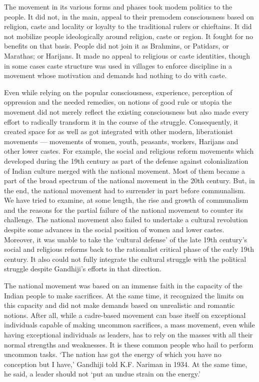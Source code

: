 The movement in its various forms and phases took modem politics to the people. It did not, in the main, appeal to their pre­modem consciousness based on religion, caste and locality or loyalty to the traditional rulers or chieftains. It did not mobilize people ideologically around religion, caste or region. It fought for no benefits on that basis. People did not join it as Brahmins, or Patidars, or Marathas; or Harijans. It made no appeal to religious or caste identities, though in some cases caste structure was used in villages to enforce discipline in a movement whose motivation and demands had nothing to do with caste.

Even while relying on the popular consciousness, experience, perception of oppression and the needed remedies, on notions of good rule or utopia the movement did not merely reflect the existing consciousness but also made every effort to radically transform it in the course of the struggle. Consequently, it created space for as well as got integrated with other modern, liberationist movements --- movements of women, youth, peasants, workers, Harijans and other lower castes. For example, the social and religious reform movements which developed during the 19th century as part of the defense against colonialization of Indian culture merged with the national movement. Most of them became a part of the broad spectrum of the national movement in the 20th century. But, in the end, the national movement had to surrender in part before communalism. We have tried to examine, at some length, the rise and growth of communalism and the reasons for the partial failure of the national movement to counter its challenge. The national movement also failed to undertake a cultural revolution despite some advances in the social position of women and lower castes. Moreover, it was unable to take the `cultural defense' of the late 19th century's social and religious reforms back to the rationalist critical phase of the early 19th century. It also could not fully integrate the cultural struggle with the political struggle despite Gandhiji's efforts in that direction.

The national movement was based on an immense faith in the capacity of the Indian people to make sacrifices. At the same time, it recognized the limits on this capacity and did not make demands based on unrealistic and romantic notions. After all, while a cadre-based movement can base itself on exceptional individuals capable of making uncommon sacrifices, a mass movement, even while having exceptional individuals as leaders, has to rely on the masses with all their normal strengths and weaknesses. It is these common people who hail to perform uncommon tasks. `The nation has got the energy of which you have no conception but I have,' Gandhiji told K.F. Nariman in 1934. At the same time, he said, a leader should not `put an undue strain on the energy.'

